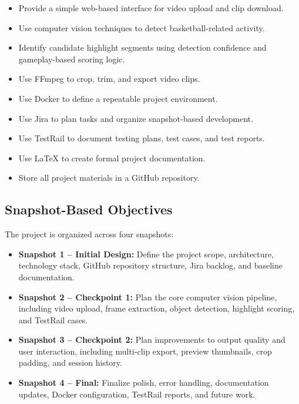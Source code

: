 \documentclass[12pt]{article}
\begin{document}
\begin{itemize}[noitemsep]
    \item Provide a simple web-based interface for video upload and clip download.
    \item Use computer vision techniques to detect basketball-related activity.
    \item Identify candidate highlight segments using detection confidence and gameplay-based scoring logic.
    \item Use FFmpeg to crop, trim, and export video clips.
    \item Use Docker to define a repeatable project environment.
    \item Use Jira to plan tasks and organize snapshot-based development.
    \item Use TestRail to document testing plans, test cases, and test reports.
    \item Use LaTeX to create formal project documentation.
    \item Store all project materials in a GitHub repository.
\end{itemize}

\subsection{Snapshot-Based Objectives}
The project is organized across four snapshots:

\begin{itemize}[noitemsep]
    \item \textbf{Snapshot 1 -- Initial Design:} Define the project scope, architecture, technology stack, GitHub repository structure, Jira backlog, and baseline documentation.
    \item \textbf{Snapshot 2 -- Checkpoint 1:} Plan the core computer vision pipeline, including video upload, frame extraction, object detection, highlight scoring, and TestRail cases.
    \item \textbf{Snapshot 3 -- Checkpoint 2:} Plan improvements to output quality and user interaction, including multi-clip export, preview thumbnails, crop padding, and session history.
    \item \textbf{Snapshot 4 -- Final:} Finalize polish, error handling, documentation updates, Docker configuration, TestRail reports, and future work.
\end{itemize}

\end{document}
